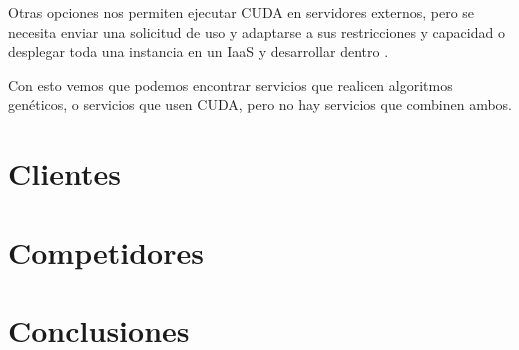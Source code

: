 Otras opciones nos permiten ejecutar CUDA en servidores externos, pero se necesita enviar una solicitud de uso y adaptarse a sus restricciones y capacidad \cite{rcuda}
o desplegar toda una instancia en un IaaS y desarrollar dentro \cite{amazoncuda}.


Con esto vemos que podemos encontrar servicios que realicen algoritmos genéticos, o servicios que usen CUDA, pero no hay servicios que combinen ambos.


\bigskip
\section{Clientes}
\bigskip


\newpage
\section{Competidores}

\newpage
\section{Conclusiones}








